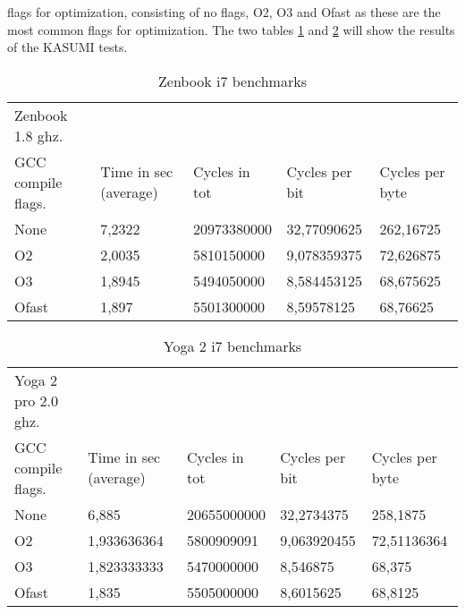flags for optimization, consisting of no flags, O2, O3 and Ofast as
these are the most common flags for optimization. The two tables
\ref{tab:zen} and \ref{tab:yoga} will show the results of the KASUMI
tests.
\begin{table}[h!]
    \begin{tabular}{l|l|l|l|l}
     Zenbook 1.8 ghz.  & ~                     & ~             & ~              & ~               \\
    GCC compile flags. & Time in sec (average) & Cycles in tot & Cycles per bit & Cycles per byte \\ \hline
    None               & 7,2322                & 20973380000   & 32,77090625    & 262,16725       \\ \hline
    O2                 & 2,0035                & 5810150000    & 9,078359375    & 72,626875       \\ \hline
    O3                 & 1,8945                & 5494050000    & 8,584453125    & 68,675625       \\ \hline
    Ofast              & 1,897                 & 5501300000    & 8,59578125     & 68,76625        \\
    \end{tabular}
    \caption{Zenbook i7 benchmarks}
    \label{tab:zen}
\end{table}
\begin{table}[h!]
    \begin{tabular}{l|l|l|l|l}
     Yoga 2 pro 2.0 ghz. & ~                     & ~             & ~              & ~               \\
    GCC compile flags.   & Time in sec (average) & Cycles in tot & Cycles per bit & Cycles per byte \\ \hline
    None                 & 6,885                 & 20655000000   & 32,2734375     & 258,1875        \\ \hline
    O2                   & 1,933636364           & 5800909091    & 9,063920455    & 72,51136364     \\ \hline
    O3                   & 1,823333333           & 5470000000    & 8,546875       & 68,375          \\ \hline
    Ofast                & 1,835                 & 5505000000    & 8,6015625      & 68,8125         \\
    \end{tabular}
    \caption{Yoga 2 i7 benchmarks}
    \label{tab:yoga}
\end{table}\\


